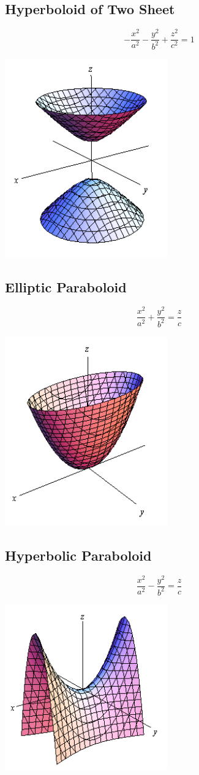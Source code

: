 \documentclass{article}
\begin{document}
\subsection*{Hyperboloid of Two Sheet}
\[ -\frac{x^2}{a^2} - \frac{y^2}{b^2} + \frac{z^2}{c^2} = 1\]
\begin{center}
	\includegraphics*[width=7cm]{hyperboloid2.png}
\end{center}

\subsection*{Elliptic Paraboloid}
\[ \frac{x^2}{a^2} + \frac{y^2}{b^2} = \frac{z}{c} \]
\begin{center}
	\includegraphics*[width=7cm]{elliptic_paraboloid.png}
\end{center}

\subsection*{Hyperbolic Paraboloid}
\[ \frac{x^2}{a^2} - \frac{y^2}{b^2} = \frac{z}{c} \]
\begin{center}
	\includegraphics*[width=7cm]{hyperbolic_paraboloid.png}
\end{center}
\end{document}
